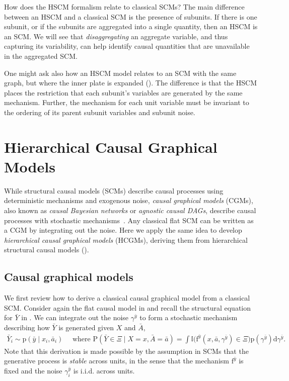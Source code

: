 \documentclass[12pt]{article}
\newcommand{\di}{\mathrm{d}}
\newcommand{\pr}{\mathrm{p}}
\newcommand{\Prob}{\mathrm{P}}
\newcommand{\f}{\mathrm{f}}
\begin{document}
How does the HSCM formalism relate to classical SCMs? The main difference between an HSCM and a classical SCM is the presence of subunits. If there is one subunit, or if the subunits are aggregated into a single quantity, then an HSCM is an SCM. We will see that \textit{disaggregating} an aggregate variable, and thus capturing its variability, can help identify causal quantities that are unavailable in the aggregated SCM.

One might ask also how an HSCM model relates to an SCM with the same
graph, but where the inner plate is expanded
(). The difference is that the HSCM
places the restriction that each subunit's variables are generated by
the same mechanism. Further, the mechanism for each unit variable must be
invariant to the ordering of its parent subunit variables and subunit noise.



 \section{Hierarchical Causal Graphical Models}
\label{sec:hcgm}

While structural causal models (SCMs) describe causal processes using
deterministic mechanisms and exogenous noise, \textit{causal graphical models}
(CGMs), also known as \textit{causal Bayesian networks} or \textit{agnostic causal DAGs}, describe causal processes with stochastic mechanisms~\citep{shalizi2013advanced,Lauritzen2001-vi,Bareinboim2021-ro,Richardson2013-yy}. Any classical flat SCM can be
written as a CGM by integrating out the noise. Here we apply the same
idea to develop \textit{hierarchical causal graphical models} (HCGMs), deriving them from hierarchical structural causal models ().





\subsection{Causal graphical models} We first review how to derive a classical causal graphical model from a classical SCM.  Consider again the flat causal model in  and recall the structural equation for $\bar{Y}$ in . We can integrate out the noise $\gamma^{\bar{y}}$ to form a stochastic mechanism describing how $\bar{Y}$ is generated given $X$ and $\bar{A}$,
\begin{align*}
  \bar{Y}_i \sim \pr(\bar{y} \mid x_i, \bar{a}_i) \quad \text{ where } \Prob(\bar{Y} \in \Xi \mid X = x, \bar{A} = \bar{a})
  =
  \int \mathbb{I}\Big(\f^{\bar{y}}(x, \bar{a}, \gamma^{\bar{y}}) \in \Xi \Big) \pr(\gamma^{\bar{y}})\di\gamma^{\bar{y}}.
\end{align*}
Note that this derivation is made possible by the assumption in SCMs that the generative process is \textit{stable} across units, in the sense that the mechanism $\f^{\bar{y}}$ is fixed and the noise $\gamma^{\bar{y}}_i$ is i.i.d. across units.
\end{document}
